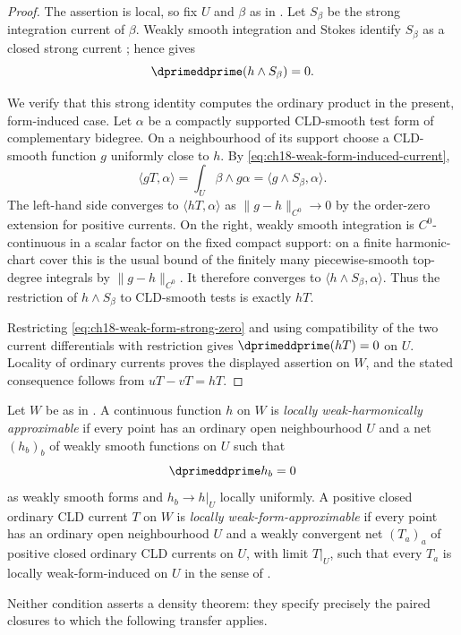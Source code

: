 \begin{proof}
The assertion is local, so fix $U$ and $\beta$ as in
.  Let $S_\beta$ be the strong
integration current of $\beta$.  Weakly smooth integration and Stokes
identify $S_\beta$ as a closed strong current
\cite[\S\S11--12]{GJR26}; hence
 gives
\begin{equation}
                         \dprimeddprime(h\wedge S_\beta)=0.
\label{eq:ch18-weak-form-strong-zero}
\end{equation}

We verify that this strong identity computes the ordinary product in the
present, form-induced case.  Let $\alpha$ be a compactly supported
CLD-smooth test form of complementary bidegree.  On a neighbourhood of its
support choose a CLD-smooth function $g$ uniformly close to $h$.  By
\eqref{eq:ch18-weak-form-induced-current},
\begin{equation}
                 \langle gT,\alpha\rangle
                 =\int_U\beta\wedge g\alpha
                 =\langle g\wedge S_\beta,\alpha\rangle.
\label{eq:ch18-weak-form-smooth-bridge}
\end{equation}
The left-hand side converges to $\langle hT,\alpha\rangle$ as
$\|g-h\|_{C^0}\to0$ by the order-zero extension for positive currents.
On the right, weakly smooth integration is $C^0$-continuous in a scalar
factor on the fixed compact support: on a finite harmonic-chart cover this
is the usual bound of the finitely many piecewise-smooth top-degree
integrals by $\|g-h\|_{C^0}$.  It therefore converges to
$\langle h\wedge S_\beta,\alpha\rangle$.  Thus the restriction of
$h\wedge S_\beta$ to CLD-smooth tests is exactly $hT$.

Restricting \eqref{eq:ch18-weak-form-strong-zero} and using compatibility
of the two current differentials with restriction gives
$\dprimeddprime(hT)=0$ on $U$.  Locality of ordinary currents proves the
displayed assertion on $W$, and the stated consequence follows from
$uT-vT=hT$.
\end{proof}

\begin{definition}
\label{def:ch18-weak-approximation-classes}
Let $W$ be as in .  A continuous
function $h$ on $W$ is \emph{locally weak-harmonically approximable} if every
point has an ordinary open neighbourhood $U$ and a net $(h_b)_b$ of weakly
smooth functions on $U$ such that
\[
                    \dprimeddprime h_b=0
\]
as weakly smooth forms and $h_b\to h|_U$ locally uniformly.  A positive
closed ordinary CLD current $T$ on $W$ is \emph{locally
weak-form-approximable} if every point has an ordinary open neighbourhood
$U$ and a weakly convergent net $(T_a)_a$ of positive closed ordinary CLD
currents on $U$, with limit $T|_U$, such that every $T_a$ is locally
weak-form-induced on $U$ in the sense of
.

Neither condition asserts a density theorem: they specify precisely the
paired closures to which the following transfer applies.
\end{definition}

